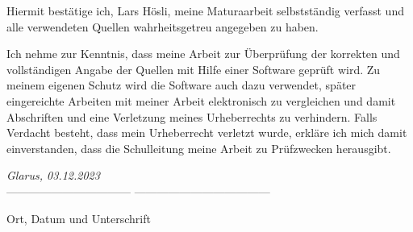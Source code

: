 \documentclass[12pt, a4paper, titlepage]{report}
\begin{document}



\pagebreak

Hiermit bestätige ich, Lars Hösli, meine Maturaarbeit selbstständig verfasst
und alle verwendeten Quellen wahrheitsgetreu angegeben zu haben.

Ich nehme zur Kenntnis, dass meine Arbeit zur Überprüfung der korrekten und
vollständigen Angabe der Quellen mit Hilfe einer Software geprüft wird. Zu meinem
eigenen Schutz wird die Software auch dazu verwendet, später eingereichte Arbeiten mit meiner Arbeit elektronisch zu vergleichen und damit Abschriften und
eine Verletzung meines Urheberrechts zu verhindern. Falls Verdacht besteht, dass
mein Urheberrecht verletzt wurde, erkläre ich mich damit einverstanden, dass die
Schulleitung meine Arbeit zu Prüfzwecken herausgibt.

\vspace{2.0cm}
\emph{Glarus, 03.12.2023}\\
--------------------------------- ------------------------------------

Ort, Datum und Unterschrift

\end{document}

